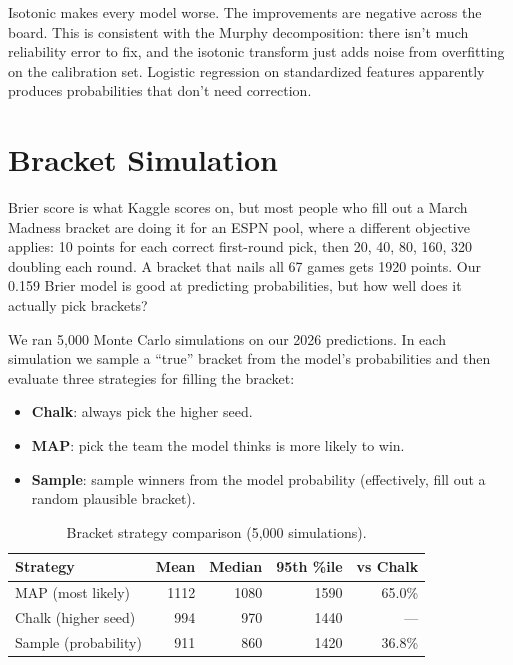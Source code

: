 \documentclass[11pt,a4paper]{article}
\begin{document}
Isotonic makes every model worse. The improvements are negative across the board. This is consistent with the Murphy decomposition: there isn't much reliability error to fix, and the isotonic transform just adds noise from overfitting on the calibration set. Logistic regression on standardized features apparently produces probabilities that don't need correction.


\section{Bracket Simulation}

Brier score is what Kaggle scores on, but most people who fill out a March Madness bracket are doing it for an ESPN pool, where a different objective applies: 10 points for each correct first-round pick, then 20, 40, 80, 160, 320 doubling each round. A bracket that nails all 67 games gets 1920 points. Our 0.159 Brier model is good at predicting probabilities, but how well does it actually pick brackets?

We ran 5{,}000 Monte Carlo simulations on our 2026 predictions. In each simulation we sample a ``true'' bracket from the model's probabilities and then evaluate three strategies for filling the bracket:
\begin{itemize}[nosep]
    \item \textbf{Chalk}: always pick the higher seed.
    \item \textbf{MAP}: pick the team the model thinks is more likely to win.
    \item \textbf{Sample}: sample winners from the model probability (effectively, fill out a random plausible bracket).
\end{itemize}

\begin{table}[h]
\centering
\caption{Bracket strategy comparison (5{,}000 simulations).}
\label{tab:bracket}
\small
\begin{tabular}{@{}lrrrr@{}}
\toprule
Strategy & Mean & Median & 95th \%ile & vs Chalk \\
\midrule
MAP (most likely) & 1112 & 1080 & 1590 & 65.0\% \\
Chalk (higher seed) & 994 & 970 & 1440 & --- \\
Sample (probability) & 911 & 860 & 1420 & 36.8\% \\
\bottomrule
\end{tabular}
\end{table}
\end{document}
